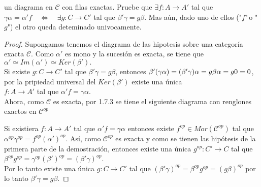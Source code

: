 \documentclass{article}
\begin{document}
\begin{enumerate}[label=\textbf{Ej \arabic*.}]
\centerline{
}

un diagrama en $\mathscr{C}$ con filas exactas. Pruebe que $\exists f:A\to A'$ tal que $\gamma\alpha=\alpha' f\quad \iff\quad \exists g:C\to C'$ tal que
$\beta'\gamma=g \beta$. Mas aún, dado uno de ellos ("$f$"\,o "$g$") el otro queda deteminado univocamente.
\begin{proof}
Supongamos tenemos el diagrama de las hipotesis sobre una categoría exacta $\mathscr{C}$. Como $\alpha'$ es mono y la sucesión es exacta, se tiene
que $\alpha'\simeq Im(\alpha')\simeq Ker(\beta').$\\

Si existe $g:C\to C'$ tal que $\beta'\gamma=g \beta$, entonces $\beta'(\gamma \alpha)=(\beta'\gamma)\alpha=g\beta\alpha\\=g0=0$, por la pripiedad 
universal del $Ker(\beta')$ existe una única \\$f:A\to A'$ tal que $\alpha' f=\gamma \alpha$.\\

Ahora, como $\mathscr{C}$ es exacta, por 1.7.3 se tiene el siguiente diagrama con renglones exactos en $\mathscr{C}^{op}$\\

\centerline{
}
Si existiera $f:A\to A'$ tal que $\alpha' f=\gamma\alpha$ entonces existe $f^{op}\in Mor(\mathscr{C}^{op})$ tal que $\alpha^{op}\gamma^{op}=
f^{op}(\alpha')^{op}$. Así, como $\mathscr{C}^{op}$ es exacta y como se tienen las hipótesis de la primera parte de la demostración, 
entonces existe una única $g^{op}:C'\to C$ tal que $\beta^{op}g^{op}=\gamma^{op}(\beta')^{op}=(\beta'\gamma)^{op}$. \\

Por lo tanto existe una única $g:C\to C'$ tal que $(\beta'\gamma)^{op}=\beta^{op}g^{op}=(g\beta)^{op}$ por lo tanto $\beta'\gamma=g\beta$.


\end{proof}




\end{enumerate}
\end{document}
